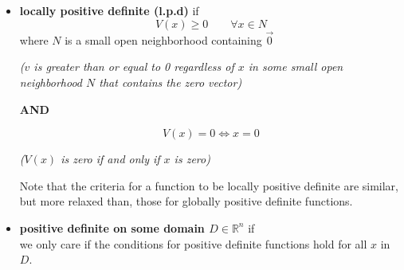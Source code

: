 {\begin{itemize}
        
    \item 
        \textbf{locally positive definite (l.p.d)} if 
        \[
            V(x) \geq 0 \qquad \forall x \in N
        \]
        where $N$ is a small open neighborhood containing $\Vec{0}$
        \begin{center}
            \textit{($v$ is greater than or equal to 0 regardless of $x$ in some small open neighborhood $N$ that contains the zero vector)}
        \end{center}
        \begin{center}
            \textbf{AND}
        \end{center}
        \[
            V(x) = 0 \iff x = 0
        \]
        \begin{center}
            \textit{($V(x)$ is zero if and only if $x$ is zero)}
        \end{center}

        Note that the criteria for a function to be locally positive definite are similar, but more relaxed than, those for globally positive definite functions.

        
    \item 
        \textbf{positive definite on some domain $D \in \mathbb{R}^n$} if \\
        we only care if the conditions for positive definite functions hold for all $x$ in $D$.
\end{itemize}
} %








